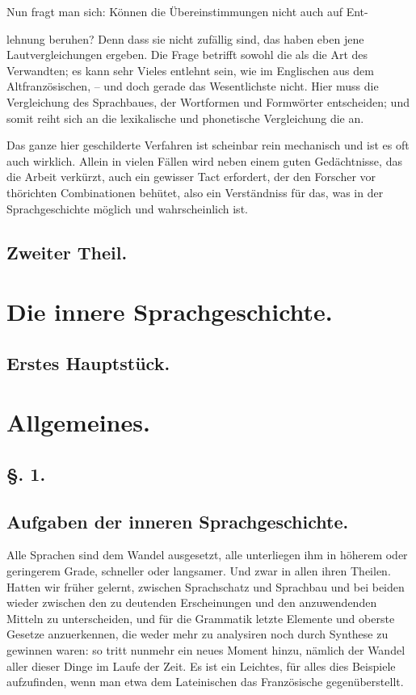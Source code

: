 Nun fragt man sich: Können die Übereinstimmungen nicht auch auf Ent- {\label{sp.168} lehnung beruhen? Denn dass sie nicht zufällig sind, das haben eben jene Lautvergleichungen ergeben. Die Frage betrifft sowohl die  als die Art des Verwandten; es kann sehr Vieles entlehnt sein, wie im Englischen aus dem Altfranzösischen, – und doch gerade das Wesentlichste nicht. Hier muss die Vergleichung des Sprachbaues, der Wortformen und Formwörter entscheiden; und somit reiht sich an die lexikalische und phonetische Vergleichung die  an.

Das ganze hier geschilderte Verfahren ist scheinbar rein mechanisch und ist es oft auch wirklich. Allein in vielen Fällen wird neben einem guten Gedächtnisse, das die Arbeit verkürzt, auch ein gewisser Tact erfordert, der den Forscher vor thörichten Combinationen behütet, also ein Verständniss für das, was in der Sprachgeschichte möglich und wahrscheinlich ist.

\subsection*{Zweiter Theil.}
\section*{Die innere Sprachgeschichte.}
\subsection*{Erstes Hauptstück.}
\section*{Allgemeines.}
\subsection*{§. 1.}\label{III.II.1}
\subsection*{Aufgaben der inneren Sprachgeschichte.}
Alle Sprachen sind dem Wandel ausgesetzt, alle unterliegen ihm in höherem oder geringerem Grade, schneller oder langsamer. Und zwar in allen ihren Theilen. Hatten wir früher gelernt, zwischen Sprachschatz und Sprachbau und bei beiden wieder zwischen den zu deutenden Erscheinungen und den anzuwendenden Mitteln zu unterscheiden, und für \label{fp.180} die Grammatik letzte Elemente und oberste Gesetze anzuerkennen, die weder mehr zu analysiren noch durch Synthese zu gewinnen waren: so tritt nunmehr ein neues Moment hinzu, nämlich der Wandel aller dieser Dinge im Laufe der Zeit. Es ist ein Leichtes, für alles dies Beispiele aufzufinden, wenn man etwa dem Lateinischen das Französische gegenüberstellt.

}

